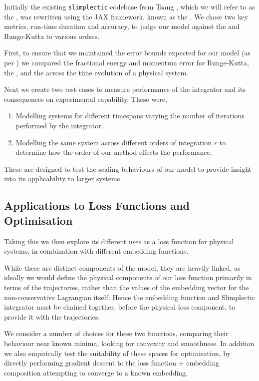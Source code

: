 Initially the existing \texttt{slimplectic} codebase from Tsang \etall \cite{originalCode}, which we will refer to as the \orgimpl{}, was rewritten using the JAX framework, known as the \updimpl{}. We chose two key metrics, run-time duration and accuracy, to judge our model against the \orgimpl{} and Runge-Kutta to various orders.

First, to ensure that we maintained the error bounds expected for our model (as per ) we compared the fractional energy and momentum error for Runge-Kutta, the \orgimpl{}, and the \updimpl{} across the time evolution of a physical system.

Next we create two test-cases to measure performance of the integrator and its consequences on experimental capability. These were,

\begin{enumerate}
	\item Modelling systems for different timespans varying the number of iterations performed by the integrator.
	\item Modelling the same system across different orders of integration $r$ to determine how the order of our method effects the performance.
\end{enumerate}

These are designed to test the scaling behaviours of our model to provide insight into its applicability to larger systems.

\subsection{Applications to Loss Functions and Optimisation}

Taking this \updimpl{} we then explore its different uses as a loss function for physical systems, in combination with different embedding functions.

While these are distinct components of the model, they are heavily linked, as ideally we would define the physical components of our loss function primarily in terms of the trajectories, rather than the values of the embedding vector for the non-conservative Lagrangian itself.
Hence the embedding function and Slimplectic integrator must be chained together, before the physical loss component, to provide it with the trajectories.

We consider a number of choices for these two functions, comparing their behaviour near known minima, looking for convexity and smoothness. In addition we also empirically test the suitability of these spaces for optimisation, by directly performing gradient descent to the loss function + embedding composition attempting to converge to a known embedding.

